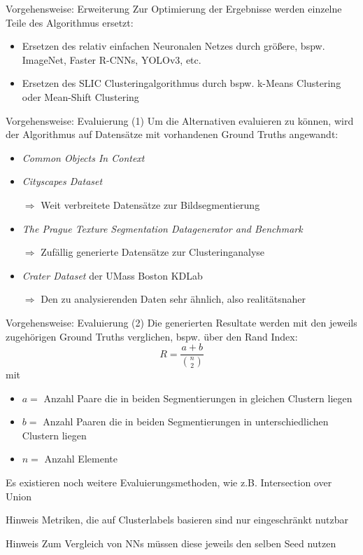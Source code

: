 \documentclass[9pt]{beamer}
\begin{document}
\begin{frame}{Vorgehensweise: Erweiterung}
Zur Optimierung der Ergebnisse werden einzelne Teile des Algorithmus ersetzt:
\begin{itemize}
	\item Ersetzen des relativ einfachen Neuronalen Netzes durch größere, bspw. ImageNet, Faster R-CNNs, YOLOv3, etc.
	\item Ersetzen des SLIC Clusteringalgorithmus durch bspw. k-Means Clustering oder Mean-Shift Clustering
\end{itemize}	
\end{frame}

\begin{frame}{Vorgehensweise: Evaluierung (1)}
Um die Alternativen evaluieren zu können, wird der Algorithmus auf Datensätze mit vorhandenen Ground Truths angewandt:
\medskip
\begin{itemize}
	\item \textit{Common Objects In Context}\cite{LMBHPRDZ:ECCV:2014}
	\item \textit{Cityscapes Dataset}\cite{Cordts2016Cityscapes}
	\item[$\Rightarrow$] Weit verbreitete Datensätze zur Bildsegmentierung
	\medskip
	\item \textit{The Prague Texture Segmentation Datagenerator and Benchmark}\cite{mikevs2015benchmarking}
	\item[$\Rightarrow$] Zufällig generierte Datensätze zur Clusteringanalyse
	\medskip
	\item \textit{Crater Dataset} der UMass Boston
	 KDLab\cite{umass_craters}
	\item[$\Rightarrow$] Den zu analysierenden Daten sehr ähnlich, also realitätsnaher
\end{itemize}
\end{frame}

\begin{frame}{Vorgehensweise: Evaluierung (2)}
Die generierten Resultate werden mit den jeweils zugehörigen Ground Truths verglichen, bspw. über den Rand Index:
$$R = \frac{a+b}{\binom{n}{2}}$$
mit
\begin{itemize}
	\item{$a=$} Anzahl Paare die in beiden Segmentierungen in gleichen Clustern liegen
	\item{$b=$} Anzahl Paaren die in beiden Segmentierungen in unterschiedlichen Clustern liegen
	\item{$n=$} Anzahl Elemente
\end{itemize}
\bigskip
Es existieren noch weitere Evaluierungsmethoden, wie z.B. Intersection over Union
\pause
\bigskip
\begin{block}{Hinweis}
	Metriken, die auf Clusterlabels basieren sind nur eingeschränkt nutzbar
\end{block}
\pause
\bigskip
\begin{block}{Hinweis}
	Zum Vergleich von NNs müssen diese jeweils den selben Seed nutzen
\end{block}
\end{frame}
\end{document}

